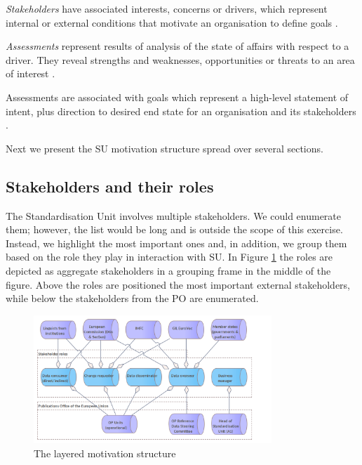 	\textit{Stakeholders} have associated interests, concerns or drivers, which represent internal or external conditions that motivate an organisation to define goals \citep{archimate3.1}.
	
	
	 
	\textit{Assessments} represent results of analysis of the state of affairs with respect to a driver. They reveal strengths and weaknesses, opportunities or threats to an area of interest \citep{archimate3.1}.
	
	Assessments are associated with goals which represent a high-level statement of intent, plus direction to desired end state for an organisation and its stakeholders \citep{archimate3.1}. 
	
	Next we present the SU motivation structure spread over several sections.
	
	\subsection{Stakeholders and their roles}
	
	The Standardisation Unit involves multiple stakeholders. We could enumerate them; however, the list would  be long and is outside the scope of this exercise. Instead, we highlight the most important ones and, in addition, we group them based on the role they play in interaction with SU. In Figure \ref{fig:stakehodlers-roles} the roles are depicted as aggregate stakeholders in a grouping frame in the middle of the figure. Above the roles are positioned the most important external stakeholders, while below the stakeholders from the PO are enumerated.
	
	\begin{figure}[!h]
		\centering
		\includegraphics[width=0.8\textwidth]{images/motivation/Stakeholders & Roles.png}
		\caption{The layered motivation structure}
		\label{fig:stakehodlers-roles}
	\end{figure}
	
